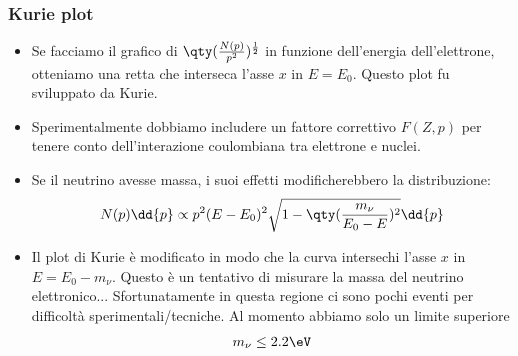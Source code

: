\subsubsection{Kurie plot}
\begin{itemize}
    \item Se facciamo il grafico di $\qty(\frac{N(p)}{p^2})^{\frac{1}{2}}$ in funzione dell'energia dell'elettrone, otteniamo una retta che interseca l'asse $x$ in $E=E_0$. Questo plot fu sviluppato da Kurie.
    \item Sperimentalmente dobbiamo includere un fattore correttivo $F(Z,p)$ per tenere conto dell'interazione coulombiana tra elettrone e nuclei.
    \item Se il neutrino avesse massa, i suoi effetti modificherebbero la distribuzione:
    \begin{equation*}
    N(p)\dd{p}\propto p^2(E-E_0)^2\sqrt{1-\qty(\frac{m_\nu}{E_0-E})^2}\dd{p}
    \end{equation*}
    \item Il plot di Kurie è modificato in modo che la curva intersechi l'asse $x$ in $E=E_0-m_\nu$. Questo è un tentativo di misurare la massa del neutrino elettronico... Sfortunatamente in questa regione ci sono pochi eventi per difficoltà sperimentali/tecniche. Al momento abbiamo solo un limite superiore
    \begin{equation*}
    m_\nu\leq2.2 \eV
    \end{equation*}
\end{itemize}
